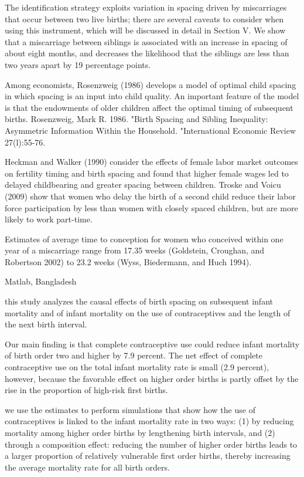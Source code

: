 The identification strategy exploits variation in spacing driven by 
miscarriages that occur between two live births; there are several caveats to 
consider when using this instrument, which will be discussed in detail in Section V. 
We show that a miscarriage between siblings is associated with an increase in 
spacing of about eight months, and decreases the likelihood that the siblings 
are less than two years apart by 19 percentage points.

Among economists, Rosenzweig (1986) develops a model of optimal child spacing
in which spacing is an input into child quality. An important feature of the model
is that the endowments of older children affect the optimal timing of subsequent
births.
Rosenzweig, Mark R. 1986. "Birth Spacing and Sibling Inequality: Asymmetric Information
Within the Household. "International Economic Review 27(l):55-76. 

Heckman and Walker (1990) consider the effects of female labor market outcomes
on fertility timing and birth spacing and found that higher female wages led to
delayed childbearing and greater spacing between children. Troske and Voicu (2009)
show that women who delay the birth of a second child reduce their labor force
participation by less than women with closely spaced children, but are more likely
to work part-time.

Estimates of average time to conception for women who conceived within one year of 
a miscarriage range from 17.35 weeks (Goldstein, Croughan, and Robertson 2002) to 23.2
weeks (Wyss, Biedermann, and Huch 1994).

\citet{Saha2013}

Matlab, Bangladesh

this study analyzes the causal effects of birth spacing on subsequent
infant mortality and of infant mortality on the use of contraceptives
and the length of the next birth interval.

Our main finding is that complete contraceptive use could reduce infant
mortality of birth order two and higher by 7.9 percent. The net effect
of complete contraceptive use on the total infant mortality rate is
small (2.9 percent), however, because the favorable effect on higher
order births is partly offset by the rise in the proportion of high-risk
first births.

we use the estimates to perform simulations that show how the use of
contraceptives is linked to the infant mortality rate in two ways: (1)
by reducing mortality among higher order births by lengthening birth
intervals, and (2) through a composition effect: reducing the number of
higher order births leads to a larger proportion of relatively
vulnerable first order births, thereby increasing the average mortality
rate for all birth orders.

